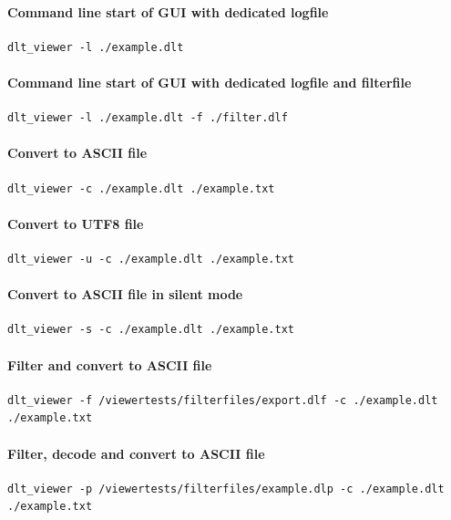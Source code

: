 \documentclass[a4paper,11pt]{article}
\begin{document}
\paragraph{Command line start of GUI with dedicated logfile}
\begin{verbatim}
dlt_viewer -l ./example.dlt
\end{verbatim}

\paragraph{Command line start of GUI with dedicated logfile and filterfile}
\begin{verbatim}
dlt_viewer -l ./example.dlt -f ./filter.dlf
\end{verbatim}


\paragraph{Convert to ASCII file}
\begin{verbatim}
dlt_viewer -c ./example.dlt ./example.txt
\end{verbatim}

\paragraph{Convert to UTF8 file}
\begin{verbatim}
dlt_viewer -u -c ./example.dlt ./example.txt
\end{verbatim}


\paragraph{Convert to ASCII file in silent mode}
\begin{verbatim}
dlt_viewer -s -c ./example.dlt ./example.txt
\end{verbatim}

\paragraph{Filter and convert to ASCII file}
\begin{verbatim}
dlt_viewer -f /viewertests/filterfiles/export.dlf -c ./example.dlt ./example.txt
\end{verbatim}

\paragraph{Filter, decode and convert to ASCII file}
\begin{verbatim}
dlt_viewer -p /viewertests/filterfiles/example.dlp -c ./example.dlt ./example.txt
\end{verbatim}
\end{document}
